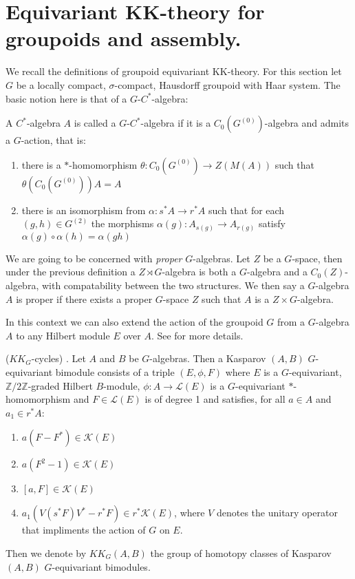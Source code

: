 \section{Equivariant KK-theory for groupoids and assembly.}
We recall the definitions of groupoid equivariant KK-theory. For this section let $G$ be a locally compact, $\sigma$-compact, Hausdorff groupoid with Haar system. The basic notion here is that of a $G$-$C^{*}$-algebra:
\begin{definition}
A $C^{*}$-algebra $A$ is called a $G$-$C^{*}$-algebra if it is a $C_{0}(G^{(0)})$-algebra and admits a $G$-action, that is:
\begin{enumerate}
\item there is a $*$-homomorphism $\theta: C_{0}(G^{(0)}) \rightarrow Z(M(A))$ such that $\theta(C_{0}(G^{(0)}))A = A$
\item there is an isomorphism from $\alpha: s^{*}A \rightarrow r^{*}A$ such that for each $(g,h) \in G^{(2)}$ the morphisms $\alpha(g):A_{s(g)} \rightarrow A_{r(g)}$ satisfy $\alpha(g)\circ \alpha(h) = \alpha(gh)$
\end{enumerate}
We are going to be concerned with \textit{proper} $G$-algebras. Let $Z$ be a $G$-space, then under the previous definition a $Z\rtimes G$-algebra is both a $G$-algebra and a $C_{0}(Z)$-algebra, with compatability between the two structures. We then say a $G$-algebra $A$ is proper if there exists a proper $G$-space $Z$ such that $A$ is a $Z\times G$-algebra.
\end{definition}

In this context we can also extend the action of the groupoid $G$ from a $G$-algebra $A$ to any Hilbert module $E$ over $A$. See \cite{MR1798599} for more details.

\begin{definition}($KK_{G}$-cycles) \cite{MR1686846,MR1703305,MR1798599}.
Let $A$ and $B$ be $G$-algebras. Then a Kasparov $(A,B)$ $G$-equivariant bimodule consists of a triple $(E,\phi, F)$ where $E$ is a $G$-equivariant, $\mathbb{Z}/2\mathbb{Z}$-graded Hilbert $B$-module, $\phi: A \rightarrow \mathcal{L}(E)$ is a $G$-equivariant $*$-homomorphism and $F\in \mathcal{L}(E)$ is of degree 1 and satisfies, for all $a \in A$ and $a_{1} \in r^{*}A$:
\begin{enumerate}
\item $a(F - F^{*}) \in \mathcal{K}(E)$
\item $a(F^{2}- 1) \in \mathcal{K}(E)$
\item $[a,F] \in \mathcal{K}(E)$
\item $a_{1}(V(s^{*}F)V^{*}-r^{*}F) \in r^{*}\mathcal{K}(E)$, where $V$ denotes the unitary operator that impliments the action of $G$ on $E$.
\end{enumerate}
Then we denote by $KK_{G}(A,B)$ the group of homotopy classes of Kasparov $(A,B)$ $G$-equivariant bimodules. 
\end{definition}

